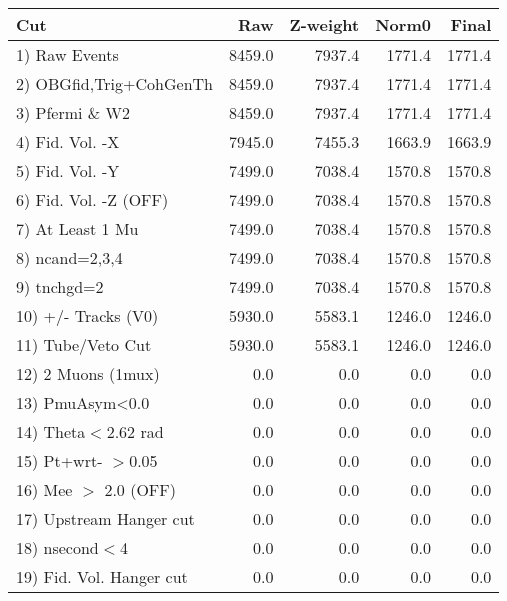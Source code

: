  \begin{table}[h!]\centering
 \begin{tabular}{||l||r|r|r|r||}
 \hline
 \hline
 Cut & Raw & Z-weight & Norm0 & Final \\
 \hline
  1) Raw Events           &      8459.0 &      7937.4 &      1771.4 &      1771.4 \\
  2) OBGfid,Trig+CohGenTh &      8459.0 &      7937.4 &      1771.4 &      1771.4 \\
  3) Pfermi \& W2         &      8459.0 &      7937.4 &      1771.4 &      1771.4 \\
  4) Fid. Vol. -X         &      7945.0 &      7455.3 &      1663.9 &      1663.9 \\
  5) Fid. Vol. -Y         &      7499.0 &      7038.4 &      1570.8 &      1570.8 \\
  6) Fid. Vol. -Z (OFF)   &      7499.0 &      7038.4 &      1570.8 &      1570.8 \\
  7) At Least 1 Mu        &      7499.0 &      7038.4 &      1570.8 &      1570.8 \\
  8) ncand=2,3,4          &      7499.0 &      7038.4 &      1570.8 &      1570.8 \\
  9) tnchgd=2             &      7499.0 &      7038.4 &      1570.8 &      1570.8 \\
 10) +/- Tracks (V0)      &      5930.0 &      5583.1 &      1246.0 &      1246.0 \\
 11) Tube/Veto Cut        &      5930.0 &      5583.1 &      1246.0 &      1246.0 \\
 12) 2 Muons (1mux)       &         0.0 &         0.0 &         0.0 &         0.0 \\
 13) PmuAsym<0.0          &         0.0 &         0.0 &         0.0 &         0.0 \\
 14) Theta$<$2.62 rad     &         0.0 &         0.0 &         0.0 &         0.0 \\
 15) Pt+wrt- $>$0.05      &         0.0 &         0.0 &         0.0 &         0.0 \\
 16) Mee $>$ 2.0  (OFF)   &         0.0 &         0.0 &         0.0 &         0.0 \\
 17) Upstream Hanger cut  &         0.0 &         0.0 &         0.0 &         0.0 \\
 18) nsecond$<$4          &         0.0 &         0.0 &         0.0 &         0.0 \\
 19) Fid. Vol. Hanger cut &         0.0 &         0.0 &         0.0 &         0.0 \\

\end{tabular}
\end{table}
